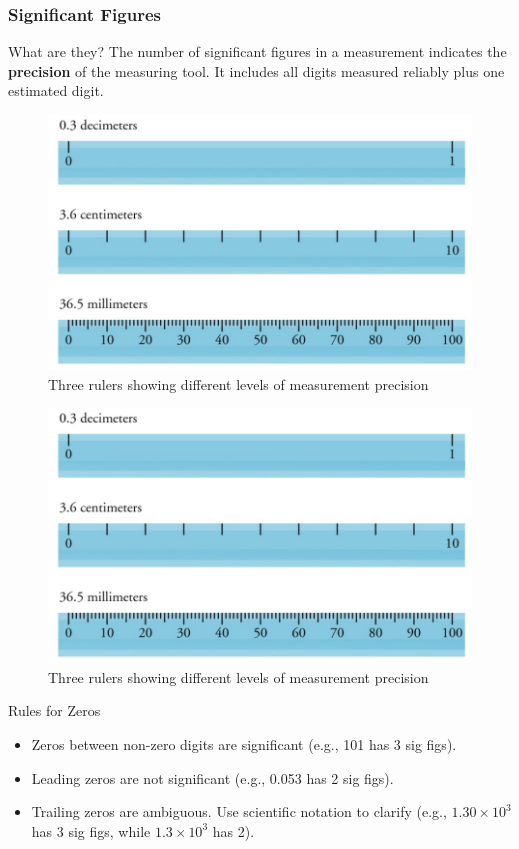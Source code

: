 \documentclass{beamer}
\begin{document}
\begin{frame}
    \frametitle{Significant Figures}
    \begin{block}{What are they?}
        The number of significant figures in a measurement indicates the \textbf{precision} of the measuring tool. It includes all digits measured reliably plus one estimated digit.
    \end{block}

    \begin{figure}
        \centering
        \includegraphics[width=0.8\linewidth]{phys11-rulers-significant-figures.png}
        \caption{Three rulers showing different levels of measurement precision}
    \end{figure}
\end{frame}

\begin{frame}
     \begin{figure}
        \centering
        \includegraphics[width=0.8\linewidth]{phys11-rulers-significant-figures.png}
        \caption{Three rulers showing different levels of measurement precision}
    \end{figure}
    \begin{block}{Rules for Zeros}
        \begin{itemize}
            \item Zeros between non-zero digits are significant (e.g., 101 has 3 sig figs).
            \item Leading zeros are not significant (e.g., 0.053 has 2 sig figs).
            \item Trailing zeros are ambiguous. Use scientific notation to clarify (e.g., \(1.30 \times 10^3\) has 3 sig figs, while \(1.3 \times 10^3\) has 2).
        \end{itemize}
    \end{block}
\end{frame}
\end{document}
